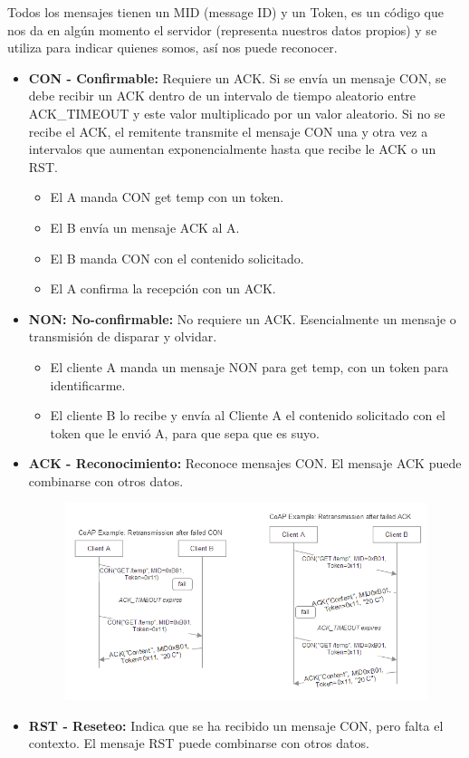 \documentclass[12pt]{report} %
\begin{document}
Todos los mensajes tienen un MID (message ID) y un Token, es un código que nos da en algún momento el servidor (representa nuestros datos propios) y se utiliza para indicar quienes somos, así nos puede reconocer.

\begin{itemize}
	\item \textbf{CON - Confirmable:} Requiere un ACK. Si se envía un mensaje CON, se debe recibir un ACK dentro de un intervalo de tiempo aleatorio entre ACK\_TIMEOUT y este valor multiplicado por un valor aleatorio. Si no se recibe el ACK, el remitente transmite el mensaje CON una y otra vez a intervalos que aumentan exponencialmente hasta que recibe le ACK o un RST.
	\begin{itemize}
		\item El A manda CON get \/temp con un token. 
		\item El B envía un mensaje ACK al A.
		\item El B manda CON con el contenido solicitado.
		\item El A confirma la recepción con un ACK.
	\end{itemize}
	\item \textbf{NON: No-confirmable:} No requiere un ACK. Esencialmente un mensaje o transmisión de disparar y olvidar.
	\begin{itemize}
		\item El cliente A manda un mensaje NON para get \/temp, con un token para identificarme.
		\item El cliente B lo recibe y envía al Cliente A el contenido solicitado con el token que le envió A, para que sepa que es suyo.
	\end{itemize}
	\item \textbf{ACK - Reconocimiento:} Reconoce mensajes CON. El mensaje ACK puede combinarse con otros datos.
	\begin{figure}[H]
		{\includegraphics[scale=.48]{b15b5a2c-b9bc-4099-8786-a2bb1272ac9c.png}}
	\end{figure}
	\item \textbf{RST - Reseteo:} Indica que se ha recibido un mensaje CON, pero falta el contexto. El mensaje RST puede combinarse con otros datos.
\end{itemize}
\end{document}
